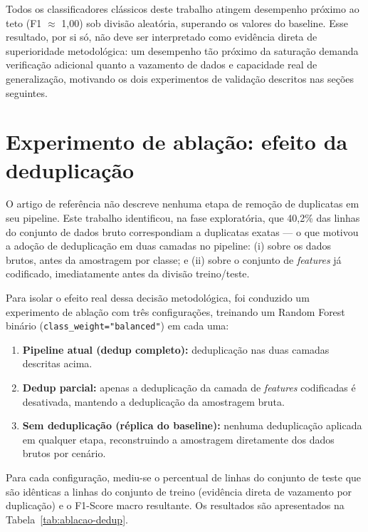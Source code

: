 Todos os classificadores clássicos deste trabalho atingem desempenho próximo ao teto (F1 $\approx$ 1{,}00) sob divisão aleatória, superando os valores do baseline. Esse resultado, por si só, não deve ser interpretado como evidência direta de superioridade metodológica: um desempenho tão próximo da saturação demanda verificação adicional quanto a vazamento de dados e capacidade real de generalização, motivando os dois experimentos de validação descritos nas seções seguintes.

\section{Experimento de ablação: efeito da deduplicação}
\label{sec:ablacao}

O artigo de referência não descreve nenhuma etapa de remoção de duplicatas em seu pipeline. Este trabalho identificou, na fase exploratória, que 40,2\% das linhas do conjunto de dados bruto correspondiam a duplicatas exatas — o que motivou a adoção de deduplicação em duas camadas no pipeline: (i) sobre os dados brutos, antes da amostragem por classe; e (ii) sobre o conjunto de \textit{features} já codificado, imediatamente antes da divisão treino/teste.

Para isolar o efeito real dessa decisão metodológica, foi conduzido um experimento de ablação com três configurações, treinando um Random Forest binário (\texttt{class\_weight="balanced"}) em cada uma:

\begin{enumerate}
    \item \textbf{Pipeline atual (dedup completo):} deduplicação nas duas camadas descritas acima.
    \item \textbf{Dedup parcial:} apenas a deduplicação da camada de \textit{features} codificadas é desativada, mantendo a deduplicação da amostragem bruta.
    \item \textbf{Sem deduplicação (réplica do baseline):} nenhuma deduplicação aplicada em qualquer etapa, reconstruindo a amostragem diretamente dos dados brutos por cenário.
\end{enumerate}

Para cada configuração, mediu-se o percentual de linhas do conjunto de teste que são idênticas a linhas do conjunto de treino (evidência direta de vazamento por duplicação) e o F1-Score macro resultante. Os resultados são apresentados na Tabela~\ref{tab:ablacao-dedup}.

